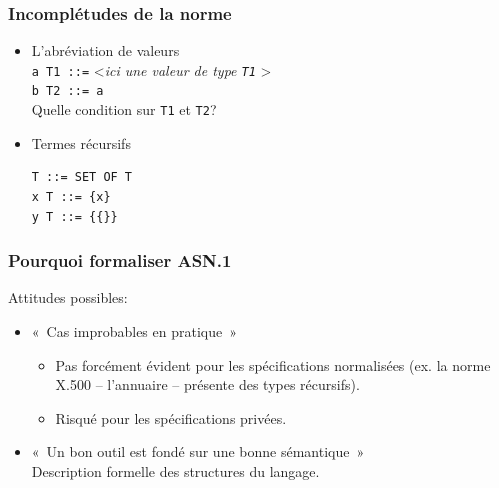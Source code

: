 \documentclass[compress,dvips,xcolor={dvipsnames},t]{beamer}
\begin{document}
\begin{frame}[fragile]
\frametitle{Incomplétudes de la norme}

\begin{itemize}

  \item L'abréviation de valeurs \\
        \verb+a T1 ::=+ <{\em ici une valeur de type \verb+T1+} \hspace*{-1mm}>\\
        \verb+b T2 ::= a+ \\
        Quelle condition sur \verb+T1+ et \verb+T2+? \\

  \item Termes récursifs

\begin{verbatim}
T ::= SET OF T
x T ::= {x}
y T ::= {{}}
\end{verbatim}

\end{itemize}

\end{frame}


\begin{frame}
\frametitle{Pourquoi formaliser ASN.1}

Attitudes possibles:
\begin{itemize}

  \item «~Cas improbables en pratique~»

        \begin{itemize}

          \item Pas forcément évident pour les
                spécifications normalisées (ex. la norme X.500 --
                l'annuaire -- présente des types récursifs).

          \item Risqué pour les spécifications privées.

        \end{itemize} \vspace*{10mm}

  \item «~Un bon outil est fondé sur une bonne sémantique~» \\
          Description formelle des structures du langage.

\end{itemize}

\end{frame}
\end{document}
